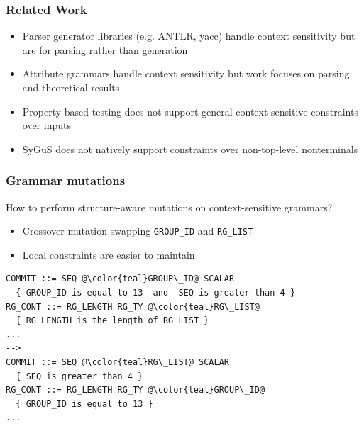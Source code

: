 \documentclass[11pt,xcolor={dvipsnames},hyperref={pdftex,pdfpagemode=UseNone,hidelinks,pdfdisplaydoctitle=true},usepdftitle=false]{beamer}
\newcommand{\green}[1]{\textcolor{green!60!black}{#1}}
\begin{document}
\begin{frame} 
    \frametitle{Related Work} 
    \begin{itemize}
        \item Parser generator libraries (e.g. ANTLR, yacc) handle context sensitivity 
        but are for \green{parsing} rather than generation
        \item Attribute grammars handle context sensitivity but work focuses on \green{parsing} and theoretical results
        \item Property-based testing does not support \green{general context-sensitive constraints} over inputs
        \item SyGuS does not natively support \green{constraints over non-top-level nonterminals} 
    \end{itemize}
    
\end{frame}

\begin{frame}[fragile]
    \frametitle{Grammar mutations}
How to perform structure-aware mutations on context-sensitive grammars?
\begin{itemize}
    \item \green{Crossover mutation} swapping {\scriptsize\texttt{GROUP\_ID}} and {\scriptsize\texttt{RG\_LIST}}
    \item \green{Local constraints} are easier to maintain
\end{itemize}

\begin{lstlisting}[style=plain]
COMMIT ::= SEQ @\color{teal}GROUP\_ID@ SCALAR
  { GROUP_ID is equal to 13  and  SEQ is greater than 4 }
RG_CONT ::= RG_LENGTH RG_TY @\color{teal}RG\_LIST@
  { RG_LENGTH is the length of RG_LIST }
...
-->
COMMIT ::= SEQ @\color{teal}RG\_LIST@ SCALAR
  { SEQ is greater than 4 }
RG_CONT ::= RG_LENGTH RG_TY @\color{teal}GROUP\_ID@
  { GROUP_ID is equal to 13 }
...
\end{lstlisting}
\end{frame}
\end{document}
